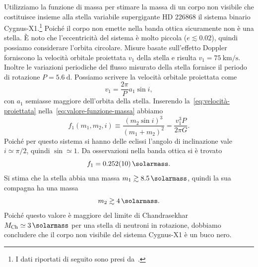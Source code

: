 Utilizziamo la funzione di massa per stimare la massa di un corpo non visibile
che costituisce insieme alla stella variabile supergigante HD 226868 il sistema
binario
Cygnus-X1.\footnote{I dati riportati di seguito sono presi
  da~\textcite{melia:astrophysics}.} Poiché il corpo non emette nella banda
ottica sicuramente non è una stella. È noto che l'eccentricità del sistema è
molto piccola ($e \lesssim 0.02$), quindi possiamo considerare l'orbita
circolare. Misure basate sull'effetto Doppler forniscono la velocità orbitale
proiettata $v_1$ della stella e risulta $v_1 =
\SI{75}{\kilo\metre\per\second}$. Inoltre le variazioni periodiche del flusso
misurato della stella fornisce il periodo di rotazione $P =
\SI{5.6}{\day}$. Possiamo scrivere la velocità orbitale proiettata come
\begin{equation}
  \label{eq:velocità-proiettata}
  v_1 = \frac{2\pi}{P}a_1\sin i,
\end{equation}
con $a_1$ semiasse maggiore dell'orbita della stella. Inserendo
la~\eqref{eq:velocità-proiettata} nella~\eqref{eq:valore-funzione-massa} abbiamo
\begin{equation}
  f_1(m_1,m_2,i) \equiv \frac{(m_2\sin i)^3}{(m_1 + m_2)^2} = \frac{v_1^3P}{2\pi
    G}.
\end{equation}
Poiché per questo sistema si hanno delle eclissi l'angolo di inclinazione vale
$i \simeq \pi/2$, quindi $\sin \simeq 1$. Da osservazioni nella banda ottica si
è trovato
\begin{equation}
  f_1 = \SI{0.252(10)}{\solarmass}.
\end{equation}
Si stima che la stella abbia una massa $m_1 \gtrsim \SI{8.5}{\solarmass}$,
quindi la sua compagna ha una massa
\begin{equation}
  m_2 \gtrsim \SI{4}{\solarmass}.
\end{equation}
Poiché questo valore è maggiore del limite di Chandrasekhar %
$M_\textup{Ch} \simeq \SI{3}{\solarmass}$ per una stella di neutroni in
rotazione, dobbiamo concludere che il corpo non visibile del sistema Cygnus-X1 è
un buco nero.

